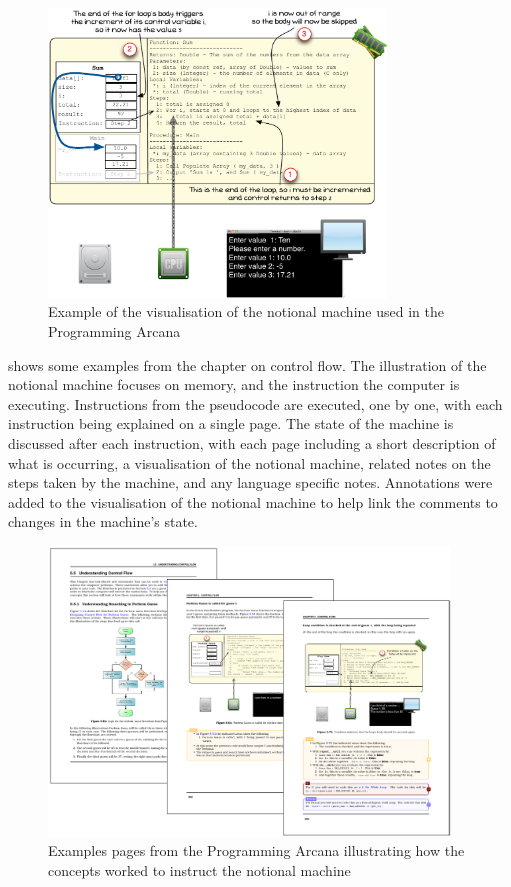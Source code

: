\begin{figure}[p]
  \centering
  \includegraphics[width=0.8\textwidth]{NotionalMachine}
  \caption{Example of the visualisation of the notional machine used in the Programming Arcana}
  \label{fig:notional_machine}
\end{figure}


 shows some examples from the chapter on control flow. The illustration of the notional machine focuses on memory, and the instruction the computer is executing. Instructions from the pseudocode are executed, one by one, with each instruction being explained on a single page. The state of the machine is discussed after each instruction, with each page including a short description of what is occurring, a visualisation of the notional machine, related notes on the steps taken by the machine, and any language specific notes. Annotations were added to the visualisation of the notional machine to help link the comments to changes in the machine's state.

\begin{figure}[p]
  \centering
  \includegraphics[width=0.95\textwidth]{ArcanaUnderstand}
  \caption{Examples pages from the Programming Arcana illustrating how the concepts worked to instruct the notional machine}
  \label{fig:arcana_understanding}
\end{figure}


